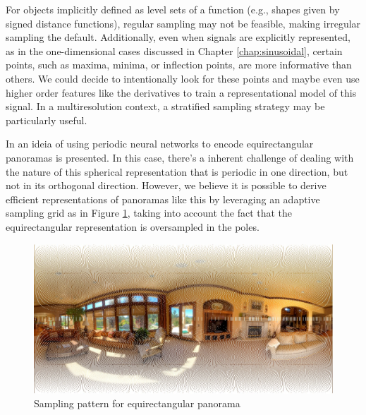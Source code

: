 For objects implicitly defined as level sets of a function (e.g., shapes given by signed distance functions), regular sampling may not be feasible, making irregular sampling the default. Additionally, even when signals are explicitly represented, as in the one-dimensional cases discussed in Chapter \ref{chap:sinusoidal}, certain points, such as maxima, minima, or inflection points, are more informative than others. We could decide to intentionally look for these points and maybe even use higher order features like the derivatives to train a representational model of this signal. In a multiresolution context, a stratified sampling strategy may be particularly useful. 



In \citet{spectralPoster24} an ideia of using periodic neural networks to encode equirectangular panoramas is presented. In this case, there's a inherent challenge of dealing with the nature of this spherical representation that is periodic in one direction, but not in its orthogonal direction. However, we believe it is possible to derive efficient representations of panoramas like this by leveraging an adaptive sampling grid as in Figure \ref{f:inr-panorama}, taking into account the fact that the equirectangular representation is oversampled in the poles.


\begin{figure}[!ht]
   \centering
   \includegraphics[width=0.80\linewidth]{img/ch7/sampling-pattern.jpeg}
   \caption{Sampling pattern for equirectangular panorama} 
   \label{f:inr-panorama}
\end{figure}


